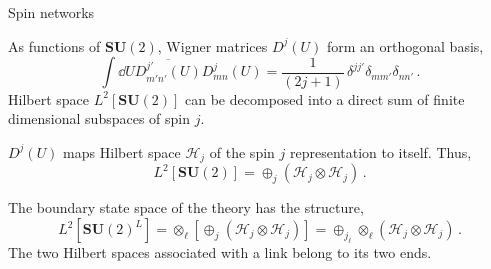 \documentclass[12pt,titlepage]{article}
\begin{document}
\begin{frame}{Spin networks}
    \begin{list}{\,}{\leftmargin=1em \itemindent=0em}
        \item<1-> As functions of $\mathbf{SU}(2)$, Wigner matrices $D^j(U)$ form an orthogonal basis,
        \begin{equation}
            \int\dd{U}\overline{D^{j'}_{m'n'}(U)}D^{j}_{mn}(U)=\frac{1}{(2j+1)}\, \delta^{jj'}\delta_{mm'}\delta_{nn'}\,.
        \end{equation}
        Hilbert space $L^2[{\mathbf{SU}(2)}]$ can be decomposed into a direct sum of finite dimensional subspaces of spin $j$.
        \item<2-> $D^j(U)$ maps Hilbert space $\mathcal{H}_j$ of the spin $j$ representation to itself. Thus,
        \begin{equation}
            L^2[{\mathbf{SU}(2)}]=\oplus_j(\mathcal{H}_j\otimes\mathcal{H}_j)\,.
        \end{equation}
        \item<3-> The boundary state space of the theory has the structure,
        \begin{equation}
            L^2[{\mathbf{SU}(2)}^L]=\otimes_\ell\left[\oplus_j(\mathcal{H}_j\otimes\mathcal{H}_j)\right]=\oplus_{j_\ell}\otimes_\ell(\mathcal{H}_j\otimes\mathcal{H}_j)\,.
        \end{equation}
        The two Hilbert spaces associated with a link belong to its two ends.
    \end{list}
\end{frame}
\end{document}
